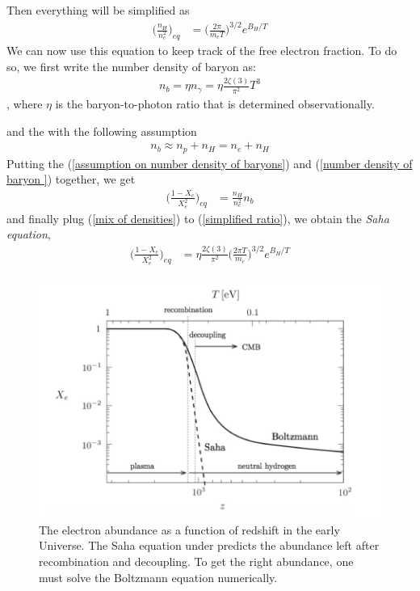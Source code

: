 \documentclass[a4paper, 12pt]{article}
\begin{document}
{{Then everything will be simplified as 
\begin{align}
  \label{simplified ratio}
  \bigg(\frac{n_H}{n_{e}^{2}} \bigg)_{eq}  &=
  \bigg(\frac{2\pi}{m_e T} \bigg)^{3/2} e^{B_H/T}  
\end{align}
We can now use this equation to keep track of the free electron fraction. To
do so, we first write the number density of baryon as: 
\begin{align}
  \label{number density of baryon }
  n_b = \eta n_{\gamma} = \eta \frac{2 \zeta(3)}{\pi^2} T^{3} 
\end{align}, where \( \eta \) is the baryon-to-photon ratio that is
determined observationally.

and the with the following assumption 
\begin{align}
  \label{assumption on number density of baryons}
  n_b \approx n_p + n_H = n_e + n_H 
\end{align}
Putting the (\ref{assumption on number density of baryons}) and (\ref{number
density of baryon }) together, we get 
\begin{align}
  \label{mix of densities}
  \bigg( \frac{1-X_e}{X_{e}^{2}} \bigg)_{eq} &=
  \frac{n_H}{n_{e}^{2}} n_b
\end{align}
and finally plug (\ref{mix of densities}) to (\ref{simplified ratio}), we
obtain the \textit{Saha equation}, 
\begin{align}
  \label{Saha equation}
  \bigg(\frac{1-X_e}{X_{e}^{2}} \bigg)_{eq} &= \eta \frac{2
  \zeta(3)}{\pi^2} \bigg(\frac{2\pi T}{m_e} \bigg)^{3/2} e^{B_H/T} 
\end{align}



\begin{figure}[h!]
\begin{center}
  \includegraphics[scale=0.3]{Figures/Saha.jpeg}
\end{center}
\caption{The electron abundance as a function of redshift in the early
  Universe. The Saha equation under predicts the abundance left after
  recombination and decoupling. To get the right abundance, one must solve
  the Boltzmann equation numerically.}
\label{fig:Saha}
\end{figure}



}}
\end{document}
